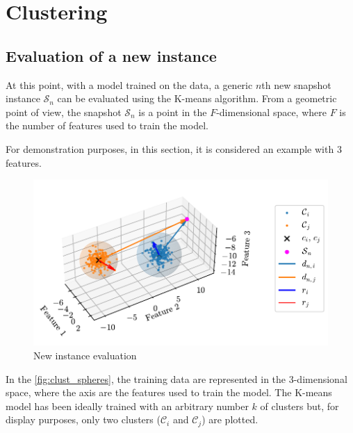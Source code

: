 \chapter{Clustering}

\section{Evaluation of a new instance}

At this point, with a model trained on the data, a generic $n$th new snapshot instance $\mathcal{S}_n$ can be evaluated using the K-means algorithm.
From a geometric point of view, the snapshot $\mathcal{S}_n$ is a point in the $F$-dimensional space, where $F$ is the number of features used to train the model.

For demonstration purposes, in this section, it is considered an example with $3$ features.

\begin{figure}[htbp]
  \centering
  \includegraphics[width=\textwidth]{images/Spheres_2.pdf}
\caption{New instance evaluation}
\label{fig:clust_spheres}
\end{figure}

In the \autoref{fig:clust_spheres}, the training data are represented in the $3$-dimensional space, where the axis are the features used to train the model. The K-means model has been ideally trained with an arbitrary number $k$ of clusters but, for display purposes, only two clusters  ($\mathcal{C}_i$ and $\mathcal{C}_j$) are plotted. 
